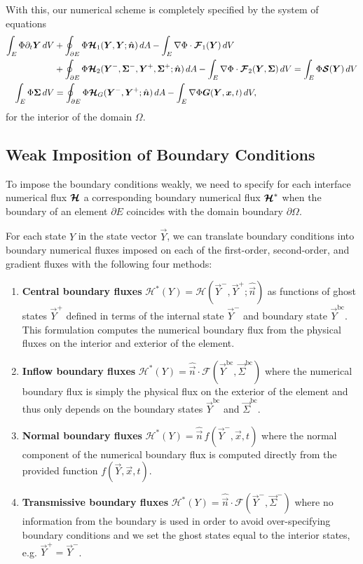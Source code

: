 \documentclass{report}
\numberwithin{equation}{section}
\begin{document}
With this, our numerical scheme is completely specified by the system of equations 
\begin{align}
    \int_E \Phi \partial_t \boldsymbol{{Y}} \, dV 
    & + \oint_{\partial E} \Phi \boldsymbol{{\mathcal{H}}}_1 (\boldsymbol{{Y}}, \boldsymbol{{Y}}; \hat{\boldsymbol{{n}} }) \, dA 
    - \int_E \nabla \Phi \cdot \boldsymbol{{\mathcal{F}}}_1(\boldsymbol{{Y}}) \, dV  \label{eq:weak_form} \\
    & + \oint_{\partial E} \Phi \boldsymbol{{\mathcal{H}}}_2 (\boldsymbol{{Y}}^-, \boldsymbol{{\Sigma}}^-, \boldsymbol{{Y}}^+, \boldsymbol{{\Sigma}}^+; \hat{\boldsymbol{{n}} }) \, dA
    - \int_E \nabla \Phi \cdot \boldsymbol{{\mathcal{F}}}_2(\boldsymbol{{Y}}, \boldsymbol{{\Sigma}}) \, dV
    = \int_E \Phi \boldsymbol{{\mathcal{S}}}(\boldsymbol{{Y}}) \, dV \nonumber \\
    \int_E \Phi \boldsymbol{{\Sigma}} \, dV
    & = \oint_{\partial E} \Phi \boldsymbol{{\mathcal{H}}}_G (\boldsymbol{{Y}}^-, \boldsymbol{{Y}}^+; \hat{\boldsymbol{{n}} }) \, dA
    - \int_E \nabla \Phi \boldsymbol{{G}}(\boldsymbol{{Y}}, \boldsymbol{{x}}, t) \, dV,
\end{align}
for the interior of the domain $\Omega$.


\subsection{Weak Imposition of Boundary Conditions}

To impose the boundary conditions weakly, we need to specify for each interface numerical flux $\boldsymbol{{\mathcal{H}}}$ a corresponding boundary numerical flux $\boldsymbol{{\mathcal{H}}}^*$ when the boundary of an element $\partial E$ coincides with the domain boundary $\partial \Omega$. 

For each state $Y$ in the state vector $\vec Y$, we can translate boundary conditions into boundary numerical fluxes imposed on each of the first-order, second-order, and gradient fluxes with the following four methods:
\begin{enumerate}
    \item \textbf{Central boundary fluxes} $\mathcal{H}^*(Y) = \mathcal{H}(\vec Y^-, \vec Y^+; \hat{\vec n })$ as functions of ghost states $\vec Y^+$ defined in terms of the internal state $\vec Y^-$ and boundary state $\vec Y^{\text{bc}}$. This formulation computes the numerical boundary flux from the physical fluxes on the interior and exterior of the element.
    \item \textbf{Inflow boundary fluxes} $\mathcal{H}^*(Y) = \hat{\vec n } \cdot \mathcal{F}(\vec Y^{\text{bc}}, \vec \Sigma^{\text{bc}})$ where the numerical boundary flux is simply the physical flux on the exterior of the element and thus only depends on the boundary states $\vec Y^{\text{bc}}$ and $\vec \Sigma^{\text{bc}}$.
    \item \textbf{Normal boundary fluxes} $\mathcal{H}^*(Y) = \hat{\vec n } \, f(\vec Y^-, \vec x, t)$ where the normal component of the numerical boundary flux is computed directly from the provided function $f(\vec Y, \vec x, t)$. 
    \item \textbf{Transmissive boundary fluxes} $\mathcal{H}^*(Y) = \hat{\vec n } \cdot \mathcal{F}(\vec Y^-, \vec \Sigma^-)$ where no information from the boundary is used in order to avoid over-specifying boundary conditions and we set the ghost states equal to the interior states, e.g. $\vec Y^+ = \vec Y^-$.
\end{enumerate}
\end{document}
